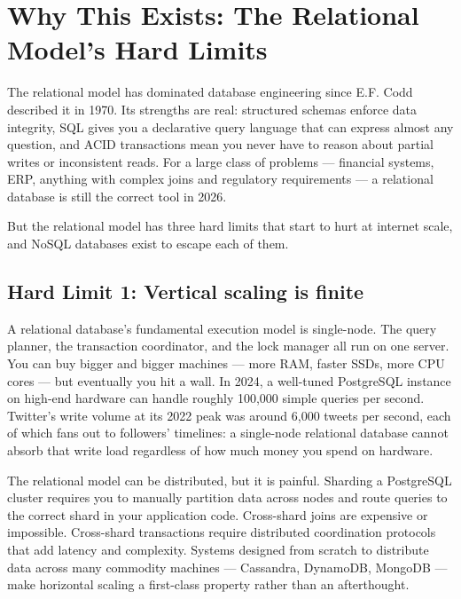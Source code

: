 \documentclass[11pt,a4paper]{article}
\begin{document}
\section{Why This Exists: The Relational Model's Hard Limits}

The relational model has dominated database engineering since E.F. Codd described it in 1970. Its strengths are real: structured schemas enforce data integrity, SQL gives you a declarative query language that can express almost any question, and ACID transactions mean you never have to reason about partial writes or inconsistent reads. For a large class of problems --- financial systems, ERP, anything with complex joins and regulatory requirements --- a relational database is still the correct tool in 2026.

But the relational model has three hard limits that start to hurt at internet scale, and NoSQL databases exist to escape each of them.

\subsection{Hard Limit 1: Vertical scaling is finite}

A relational database's fundamental execution model is single-node. The query planner, the transaction coordinator, and the lock manager all run on one server. You can buy bigger and bigger machines --- more RAM, faster SSDs, more CPU cores --- but eventually you hit a wall. In 2024, a well-tuned PostgreSQL instance on high-end hardware can handle roughly 100,000 simple queries per second. Twitter's write volume at its 2022 peak was around 6,000 tweets per second, each of which fans out to followers' timelines: a single-node relational database cannot absorb that write load regardless of how much money you spend on hardware.

The relational model can be distributed, but it is painful. Sharding a PostgreSQL cluster requires you to manually partition data across nodes and route queries to the correct shard in your application code. Cross-shard joins are expensive or impossible. Cross-shard transactions require distributed coordination protocols that add latency and complexity. Systems designed from scratch to distribute data across many commodity machines --- Cassandra, DynamoDB, MongoDB --- make horizontal scaling a first-class property rather than an afterthought.
\end{document}
